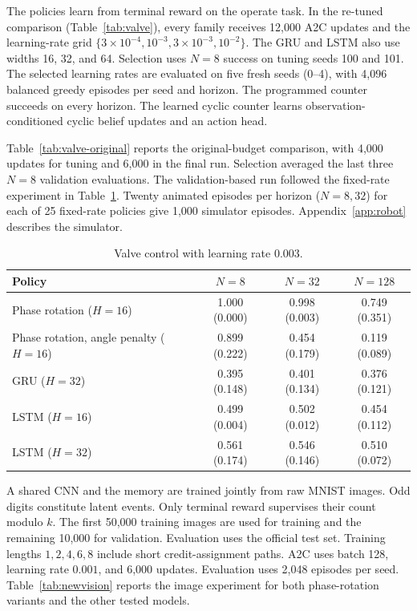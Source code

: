 The policies learn from terminal reward on the operate task. In the re-tuned
comparison (Table~\ref{tab:valve}), every family receives 12{,}000 A2C updates
and the learning-rate grid $\{3\times10^{-4},10^{-3},3\times10^{-3},10^{-2}\}$.
The GRU and LSTM also use widths 16, 32, and 64. Selection uses $N=8$ success
on tuning seeds 100 and 101. The selected learning rates are evaluated on five
fresh seeds (0--4), with 4{,}096 balanced greedy episodes per seed and horizon.
The programmed counter succeeds on every horizon. The learned cyclic counter
learns observation-conditioned cyclic belief updates and an action head.

Table~\ref{tab:valve-original} reports the original-budget comparison, with
4,000 updates for tuning and 6,000 in the final run. Selection averaged the last
three $N=8$ validation evaluations. The validation-based run followed the
fixed-rate experiment in Table~\ref{tab:valvefixed}. Twenty animated episodes
per horizon ($N=8,32$) for each of 25 fixed-rate policies give 1,000 simulator
episodes. Appendix~\ref{app:robot} describes the simulator.



\begin{table}[tbp]
\centering\small
\caption{Valve control with learning rate $0.003$.}
\label{tab:valvefixed}
\setlength{\tabcolsep}{3pt}
\begin{tabular}{lccc}
\toprule
Policy & $N=8$ & $N=32$ & $N=128$ \\
\midrule
Phase rotation ($H=16$) & 1.000 (0.000) & 0.998 (0.003) & 0.749 (0.351) \\
Phase rotation, angle penalty ($H=16$) & 0.899 (0.222) & 0.454 (0.179) & 0.119 (0.089) \\
GRU ($H=32$) & 0.395 (0.148) & 0.401 (0.134) & 0.376 (0.121) \\
LSTM ($H=16$) & 0.499 (0.004) & 0.502 (0.012) & 0.454 (0.112) \\
LSTM ($H=32$) & 0.561 (0.174) & 0.546 (0.146) & 0.510 (0.072) \\
\bottomrule
\end{tabular}
\end{table}

A shared CNN and the memory are trained jointly from raw MNIST images. Odd
digits constitute latent events. Only terminal reward supervises their count
modulo $k$. The first 50,000 training images are used for training and the
remaining 10,000 for validation. Evaluation uses the official test set. Training lengths
$1,2,4,6,8$ include short credit-assignment paths. A2C uses batch 128, learning
rate $0.001$, and 6,000 updates. Evaluation uses 2,048 episodes per seed.
Table~\ref{tab:newvision} reports the image experiment for both phase-rotation
variants and the other tested models.

